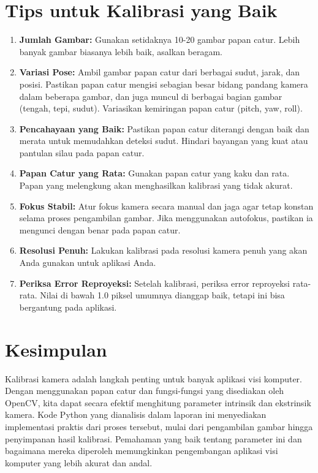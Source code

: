\documentclass[12pt,a4paper]{article}
\begin{document}
\section{Tips untuk Kalibrasi yang Baik}
\begin{enumerate}[label=\alph*.]
    \item \textbf{Jumlah Gambar:} Gunakan setidaknya 10-20 gambar papan catur. Lebih banyak gambar biasanya lebih baik, asalkan beragam.
    \item \textbf{Variasi Pose:} Ambil gambar papan catur dari berbagai sudut, jarak, dan posisi. Pastikan papan catur mengisi sebagian besar bidang pandang kamera dalam beberapa gambar, dan juga muncul di berbagai bagian gambar (tengah, tepi, sudut). Variasikan kemiringan papan catur (pitch, yaw, roll).
    \item \textbf{Pencahayaan yang Baik:} Pastikan papan catur diterangi dengan baik dan merata untuk memudahkan deteksi sudut. Hindari bayangan yang kuat atau pantulan silau pada papan catur.
    \item \textbf{Papan Catur yang Rata:} Gunakan papan catur yang kaku dan rata. Papan yang melengkung akan menghasilkan kalibrasi yang tidak akurat.
    \item \textbf{Fokus Stabil:} Atur fokus kamera secara manual dan jaga agar tetap konstan selama proses pengambilan gambar. Jika menggunakan autofokus, pastikan ia mengunci dengan benar pada papan catur.
    \item \textbf{Resolusi Penuh:} Lakukan kalibrasi pada resolusi kamera penuh yang akan Anda gunakan untuk aplikasi Anda.
    \item \textbf{Periksa Error Reproyeksi:} Setelah kalibrasi, periksa error reproyeksi rata-rata. Nilai di bawah 1.0 piksel umumnya dianggap baik, tetapi ini bisa bergantung pada aplikasi.
\end{enumerate}

\section{Kesimpulan}
Kalibrasi kamera adalah langkah penting untuk banyak aplikasi visi komputer.
Dengan menggunakan papan catur dan fungsi-fungsi yang disediakan oleh OpenCV,
kita dapat secara efektif menghitung parameter intrinsik dan ekstrinsik kamera.
Kode Python yang dianalisis dalam laporan ini menyediakan implementasi praktis
dari proses tersebut, mulai dari pengambilan gambar hingga penyimpanan hasil
kalibrasi. Pemahaman yang baik tentang parameter ini dan bagaimana mereka
diperoleh memungkinkan pengembangan aplikasi visi komputer yang lebih akurat
dan andal.
\end{document}
